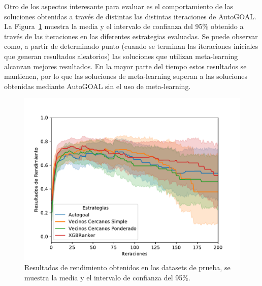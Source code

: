 %

Otro de los aspectos interesante para evaluar es el comportamiento de las soluciones obtenidas a través de distintas las distintas iteraciones de AutoGOAL. La Figura~\ref{fig:performance} muestra la media y el intervalo de confianza del 95\% obtenido a través de las iteraciones en las diferentes estrategias evaluadas. Se puede observar como, a partir de determinado punto (cuando se terminan las iteraciones iniciales que generan resultados aleatorios) las soluciones que utilizan meta-learning alcanzan mejores resultados. En la mayor parte del tiempo estos resultados se mantienen, por lo que las soluciones de meta-learning superan a las soluciones obtenidas mediante AutoGOAL sin el uso de meta-learning.

\begin{figure}[H]
\centering
\includegraphics[scale=.75]{Figures/performance}
\caption{Resultados de rendimiento obtenidos en los datasets de prueba, se muestra la media y el intervalo de confianza del 95\%.}
\label{fig:performance}
\end{figure}

